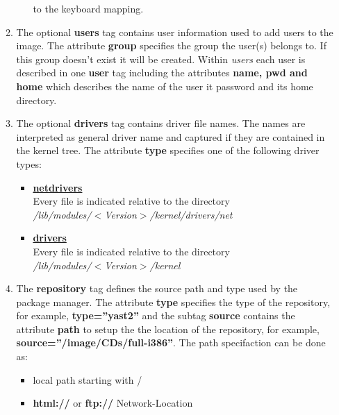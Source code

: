 \begin{itemize}
\begin{enumerate}
\begin{itemize}
                    to the keyboard mapping.
          \end{itemize}
          \item The optional \textbf{users} tag contains user information
                used to add users to the image. The attribute \textbf{group}
                specifies the group the user(s) belongs to. If this group
                doesn't exist it will be created. Within \textit{users}
                each user is described in one \textbf{user} tag including the
                attributes \textbf{name, pwd and home} which describes the
                name of the user it password and its home directory.
          \item The optional \textbf{drivers} tag contains driver file names.
                The names are interpreted as general driver name and captured
                if they are contained in the kernel tree. The attribute
                \textbf{type} specifies one of the following driver types:
                \begin{itemize}
                \item \textbf{\underline{netdrivers}}\\
                      Every file is indicated relative to the directory\\
                      \textit{/lib/modules/$<$Version$>$/kernel/drivers/net}
                \item \textbf{\underline{drivers}}\\
                      Every file is indicated relative to the directory\\
                      \textit{/lib/modules/$<$Version$>$/kernel}
                \end{itemize}
          \item The \textbf{repository} tag defines the source path and
                type used by the package manager. The attribute
                \textbf{type} specifies the
                type of the repository, for example,
                \textbf{type=''yast2''} and the subtag \textbf{source}
                contains the attribute \textbf{path} to setup the
                the location of the repository, for example,
                \textbf{source=''/image/CDs/full-i386''}. The path
                specifaction can be done as:
                \begin{itemize}
                \item local path starting with /
                \item \textbf{html://} or \textbf{ftp://} Network-Location

\end{itemize}
\end{enumerate}
\end{itemize}
